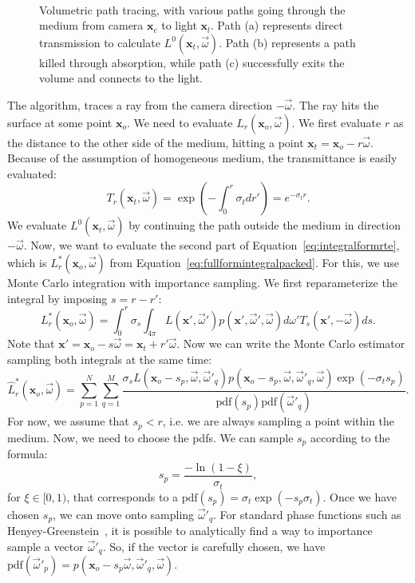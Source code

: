 \begin{figure}
\centering
   \def\svgwidth{0.7\textwidth}
    \\
\caption{Volumetric path tracing, with various paths going through the medium from camera $\mathbf{x}_c$ to light $\mathbf{x}_l$. Path (a) represents direct transmission to calculate $L^0(\mathbf{x}_t, \vec{\omega})$. Path (b) represents a path killed through absorption, while path (c) successfully exits the volume and connects to the light.} 
\label{fig:vpt}
\end{figure}

The algorithm, traces a ray from the camera direction $-\vec{\omega}$. The ray hits the surface at some point $\mathbf{x}_o$. We need to evaluate $L_r(\mathbf{x}_o, \vec{\omega})$. We first evaluate $r$ as the distance to the other side of the medium, hitting a point $\mathbf{x}_t = \mathbf{x}_o - r \vec{\omega}$. Because of the assumption of homogeneous medium, the transmittance is easily evaluated:
\begin{equation*}
T_r(\mathbf{x}_t, \vec{\omega}) = \exp\left(-\int_0^r \sigma_t dr'\right) = e^{-\sigma_t r}.
\end{equation*}
We evaluate $L^0(\mathbf{x}_t, \vec{\omega})$ by continuing the path outside the medium in direction $-\vec{\omega}$. Now, we want to evaluate the second part of Equation~\ref{eq:integralformrte}, which is $L_r^*(\mathbf{x}_o, \vec{\omega})$ from Equation~\ref{eq:fullformintegralpacked}. For this, we use Monte Carlo integration with importance sampling. We first reparameterize the integral by imposing $s = r - r'$:
\begin{equation*}
L_r^*(\mathbf{x}_o, \vec{\omega}) = \int_0^r \sigma_s \int_{4\pi} L(\mathbf{x}', \vec{\omega}') p(\mathbf{x}', \vec{\omega}', \vec{\omega})  d\omega' T_{s}(\mathbf{x}', -\vec{\omega})  ds.
\end{equation*}
Note that $\mathbf{x}' = \mathbf{x}_o - s \vec{\omega} = \mathbf{x}_t + r' \vec{\omega}$. Now we can write the Monte Carlo estimator sampling both integrals at the same time:
\begin{equation}
\label{eq:lrintermediate}
\hat{L}_r^*(\mathbf{x}_o, \vec{\omega}) = \sum_{p=1}^N\sum_{q=1}^M \frac{\sigma_s L(\mathbf{x}_o - s_p, \vec{\omega}, \vec{\omega}'_q) p(\mathbf{x}_o - s_p, \vec{\omega}, \vec{\omega}'_q, \vec{\omega}) \exp(-\sigma_t s_p)}{\text{pdf}(s_p) \text{pdf}(\vec{\omega}'_q)}.
\end{equation}
For now, we assume that $s_p < r$, i.e. we are always sampling a point within the medium. Now, we need to choose the pdfs.  We can sample $s_p$ according to the formula:
\begin{equation*}
s_p = \frac{-\ln(1 - \xi)}{\sigma_t},
\end{equation*}
for $\xi \in [0,1)$, that corresponds to a $\text{pdf}(s_p) = \sigma_t \exp(-s_p \sigma_t)$. Once we have chosen $s_p$, we can move onto sampling $\vec{\omega}'_q$. For standard phase functions such as Henyey-Greenstein~\cite{Henyey1940}, it is possible to analytically find a way to importance sample a vector $\vec{\omega}'_q$. So, if the vector is carefully chosen, we have $\text{pdf}(\vec{\omega}'_p) = p(\mathbf{x}_o - s_p \vec{\omega}, \vec{\omega}'_q, \vec{\omega})$.

